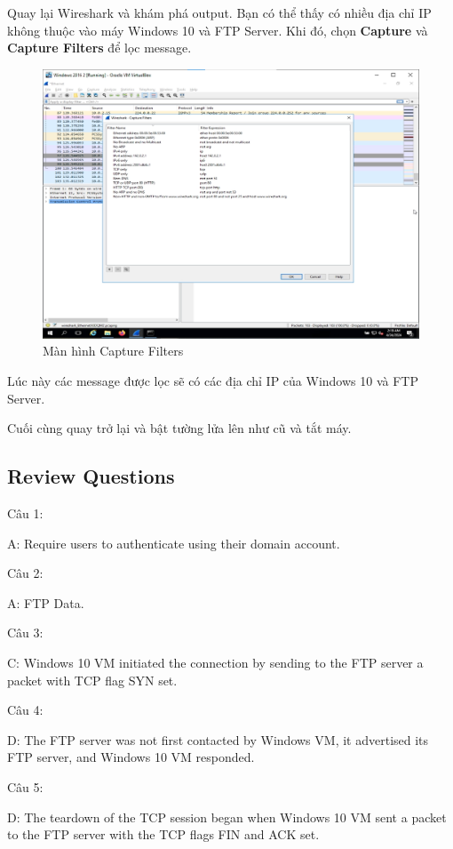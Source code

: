 \newpage

 Quay lại Wireshark và khám phá output. Bạn có thể thấy có nhiều địa chỉ IP không thuộc vào máy Windows 10 và FTP Server. Khi đó, chọn \textbf{Capture} và \textbf{Capture Filters} để lọc message. 

\begin{figure}[!htb]
    \centering
    \includegraphics[width=0.9\linewidth]{figure//chapter9//lab9_3/capture-filters.png}
    \caption{Màn hình Capture Filters}
    \label{fig:enter-label}
\end{figure}

\noindent Lúc này các message được lọc sẽ có các địa chỉ IP của Windows 10 và FTP Server.

Cuối cùng quay trở lại và bật tường lửa lên như cũ và tắt máy.

\subsection{Review Questions}

\noindent Câu 1:

A: Require users to authenticate using their domain account.

\noindent Câu 2: 

A: FTP Data.

\noindent Câu 3: 

C: Windows 10 VM initiated the connection by sending to the FTP server a packet with TCP flag SYN set.

\noindent Câu 4: 

D: The FTP server was not first contacted by Windows VM, it advertised its FTP server, and Windows 10 VM responded.

\noindent Câu 5:

D: The teardown of the TCP session began when Windows 10 VM sent a packet to the FTP server with the TCP flags FIN and ACK set.
